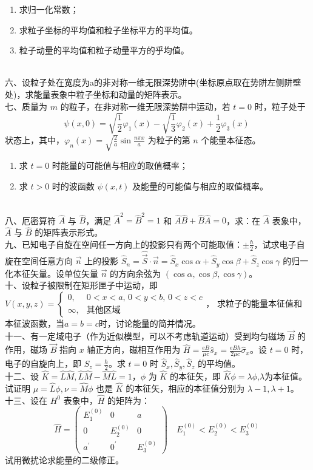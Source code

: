 \begin{enumerate}
    \item 求归一化常数；
    \item 求粒子坐标的平均值和粒子坐标平方的平均值。
    \item 粒子动量的平均值和粒子动量平方的乎均值。
\end{enumerate}\\
六、设粒子处在宽度为a的非对称一维无限深势阱中(坐标原点取在势阱左侧阱壁处)，求能量表象中粒子坐标和动量的矩阵表示。\\
七、质量为 $m$ 的粒子，在非对称一维无限深势阱中运动，若 $t=0$ 时，粒子处于
\[
\psi(x,0) = \sqrt{\frac{1}{2}} \varphi_1(x) - \sqrt{\frac{1}{3}} \varphi_2(x) + \frac{1}{2} \varphi_3(x)~
\]
状态上，其中，$\varphi_n(x) = \sqrt{\frac{2}{a}} \sin \frac{n\pi x}{a}$ 为粒子的第 $n$ 个能量本征态。

\begin{enumerate}
    \item 求 $t=0$ 时能量的可能值与相应的取值概率；
    \item 求 $t>0$ 时的波函数 $\psi(x,t)$ 及能量的可能值与相应的取值概率。
\end{enumerate}\\
八、厄密算符 $\hat{A}$ 与 $\hat{B}$，满足 $\hat{A}^2 = \hat{B}^2 = 1$ 和 $\hat{A}\hat{B} + \hat{B}\hat{A} = 0$，求：在 $\hat{A}$ 表象中，$\hat{A}$ 与 $\hat{B}$ 的矩阵表示形式。\\
九、已知电子自旋在空间任一方向上的投影只有两个可能取值：$\pm \frac{\hbar}{2}$，试求电子自旋在空间任意方向 $\vec{n}$ 上的投影 $\hat S_n = \hat{\vec{S}} \cdot \vec{n} =\hat S_x \cos \alpha + \hat S_y \cos \beta + \hat S_z \cos \gamma$ 的归一化本征矢量。设单位矢量 $\vec{n}$ 的方向余弦为 $(\cos \alpha, \cos \beta, \cos \gamma)$。\\
十、设粒子被限制在矩形匣子中运动，即 $V(x,y,z) = 
\begin{cases} 
0, & 0 < x < a, \, 0 < y < b, \, 0 < z < c \\
\infty, & \text{其他区域}
\end{cases}$，
求粒子的能量本征值和本征波函数，当$a=b=c$时，讨论能量的简并情况。\\
十一、有一定域电子（作为近似模型，可以不考虑轨道运动）受到均匀磁场 $\vec{B}$ 的作用，磁场 $\vec{B}$ 指向 $x$ 轴正方向，磁相互作用为 $\hat{H} = \frac{eB}{\mu c} \hat{s}_x = \frac{eB\hbar}{2\mu c} \hat{\sigma}_x$。设 $t=0$ 时，电子的自旋向上，即 $S_z = \frac{\hbar}{2}$。求 $t=0$ 时 $\hat S_x, \hat S_y, \hat S_z$ 的平均值。\\
十二、设 $\hat{K} = \hat{L}\hat{M},\hat{L}\hat{M} - \hat{M}\hat{L}=1$，$\phi$ 为 $\hat{K}$ 的本征矢，即 $\hat{K}\phi = \lambda \phi$,$\lambda$为本征值。试证明 $\mu = \hat{L}\phi, \nu = \hat{M}\phi$ 也是 $\hat{K}$ 的本征矢，相应的本征值分别为 $\lambda - 1, \lambda + 1$。\\
十三、设在 $H^0$ 表象中，$\hat{H}$ 的矩阵为：
\[
\hat{H} = \begin{pmatrix}
E_1^{(0)} & 0 & a \\
0 & E_2^{(0)} & 0 \\
a^\prime & 0^\prime & E_3^{(0)}
\end{pmatrix} \quad E_1^{(0)} < E_2^{(0)} < E_3^{(0)}~
\]
试用微扰论求能量的二级修正。


